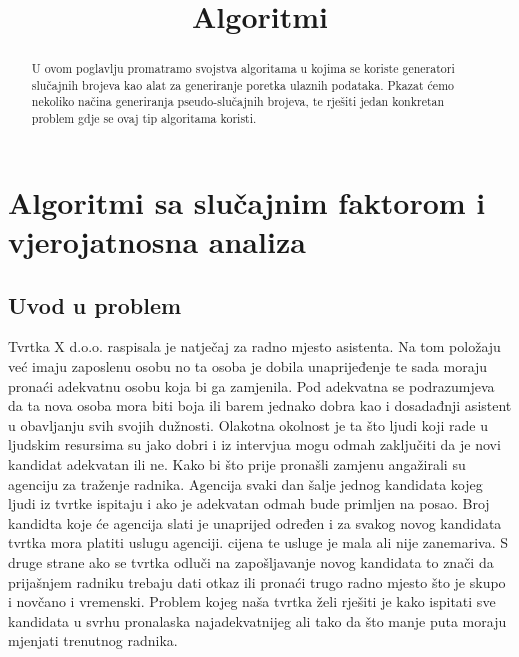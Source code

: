 \documentclass[10pt,a4paper]{article}
\title{Algoritmi}
\begin{document}
\maketitle
\tableofcontents
\newpage
\section{Algoritmi sa slučajnim faktorom i vjerojatnosna analiza} %
\label{sec:algoritmi_sa_slu_ajnim_faktorom_i_vjerojatnosna_analiza}

\begin{abstract}
U ovom poglavlju promatramo svojstva algoritama u kojima se koriste 
generatori slučajnih brojeva kao alat za generiranje poretka ulaznih podataka. 
Pkazat ćemo nekoliko načina generiranja pseudo-slučajnih brojeva, te rješiti jedan 
konkretan problem gdje se ovaj tip algoritama koristi.
\end{abstract}
\subsection{Uvod u problem}
Tvrtka X d.o.o. raspisala je natječaj za radno mjesto asistenta. Na tom položaju već imaju 
zaposlenu osobu no ta osoba je dobila unaprijeđenje te sada moraju pronaći adekvatnu osobu 
koja bi ga zamjenila. Pod adekvatna se podrazumjeva da ta nova osoba mora biti boja ili barem 
jednako dobra kao i dosadađnji asistent u obavljanju svih svojih dužnosti. Olakotna okolnost je 
ta što ljudi koji rade u ljudskim resursima  su jako dobri i iz intervjua mogu odmah zaključiti 
da je novi kandidat adekvatan ili ne.
Kako bi što prije pronašli zamjenu angažirali su agenciju za traženje radnika. 
Agencija svaki dan šalje jednog kandidata kojeg ljudi iz tvrtke ispitaju i ako je 
adekvatan odmah bude primljen na posao. Broj kandidta koje će agencija slati je unaprijed 
određen i za svakog novog kandidata tvrtka mora platiti uslugu agenciji. cijena te usluge je
mala ali nije zanemariva. S druge strane ako se tvrtka odluči na zapošljavanje novog kandidata 
to znači da prijašnjem radniku trebaju dati otkaz ili pronaći trugo radno mjesto što je skupo i novčano i vremenski.
Problem kojeg naša tvrtka želi rješiti je kako ispitati sve kandidata u svrhu pronalaska najadekvatnijeg 
ali tako da što manje puta moraju mjenjati trenutnog radnika.\\
\end{document}
